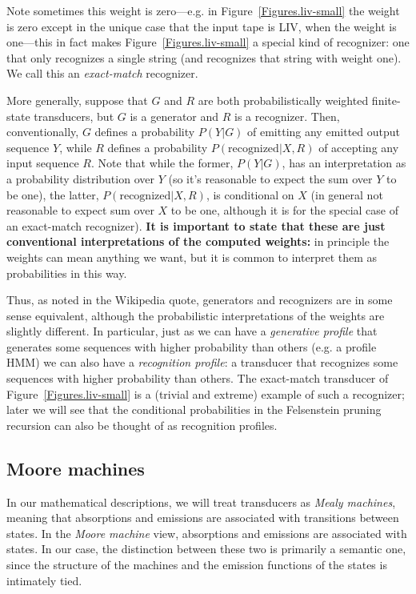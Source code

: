\documentclass{article}
\newcommand{\figref}[1]{Figure~\ref{Figures.#1}}
\begin{document}
Note sometimes this weight is zero---e.g. in \figref{liv-small} the weight is zero
except in the unique case that the input tape is LIV, when the weight is one---this
in fact makes \figref{liv-small} a special kind of recognizer:
one that only recognizes a single string
(and recognizes that string with weight one).
We call this an {\em exact-match} recognizer.

More generally, suppose that $G$ and $R$ are both probabilistically weighted finite-state transducers,
but $G$ is a generator and $R$ is a recognizer.
Then, conventionally, $G$ defines a probability $P(Y|G)$ of emitting any emitted output sequence $Y$,
while $R$ defines a probability $P(\mbox{recognized}|X,R)$ of accepting any input sequence $R$.
Note that while the former, $P(Y|G)$, has an interpretation as a probability distribution over $Y$
(so it's reasonable to expect the sum over $Y$ to be one),
the latter, $P(\mbox{recognized}|X,R)$, is conditional on $X$
(in general not reasonable to expect sum over $X$ to be one,
although it is for the special case of an exact-match recognizer).
{\bf It is important to state that these are just conventional interpretations of the computed weights:}
in principle the weights can mean anything we want,
but it is common to interpret them as probabilities in this way.

Thus, as noted in the Wikipedia quote, generators and recognizers are in some sense equivalent,
although the probabilistic interpretations of the weights are slightly different.
In particular, just as we can have a {\em generative profile}
that generates some sequences with higher probability than others (e.g. a profile HMM)
we can also have a {\em recognition profile}: a transducer
that recognizes some sequences with higher probability than others.
The exact-match transducer of \figref{liv-small} is a (trivial and extreme) example of such a recognizer;
later we will see that the conditional probabilities in the Felsenstein pruning recursion can also
be thought of as recognition profiles.

\subsection{Moore machines}

In our mathematical descriptions, we will treat transducers as
{\em Mealy machines}, meaning that absorptions and emissions are associated with transitions between states.  
In the {\em Moore machine} view, absorptions and emissions are associated with states.  
In our case, the distinction between these two is primarily a semantic one, since the structure 
of the machines and the emission functions of the states is intimately tied.
\end{document}
